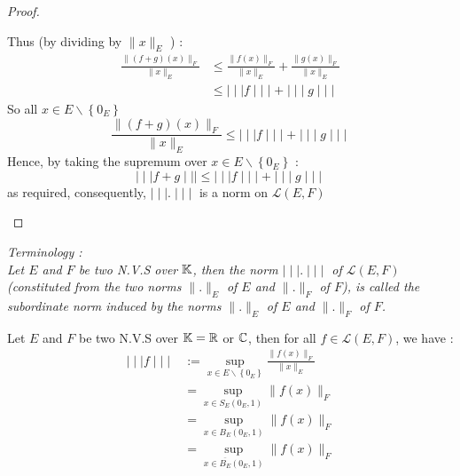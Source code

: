 \begin{proof}
\begin{enumerate}[(i)]
		Thus (by dividing by $\| x \| _{E}$ ) : 
		\begin{align*}
		\frac{\| (f+g) (x)  \|_{F} }{ \| x \|_{E} } 
		& \leq 
		\frac{\| f(x)  \| _{F}}{\| x \|_{E} } + 
		\frac{\| g(x)  \| _{F}}{\| x \| _{E}} 
		\\
		& \leq 
		\mid \mid \mid  f \mid \mid \mid  + 
		\mid \mid \mid  g \mid \mid \mid 
		\end{align*}
		So all $x \in E \backslash \left\{ 0_{E} \right\}$ 
		\[
			\frac{\| (f+g)(x)    \|_{F} }{
			\| x \| _{E}} 
			\leq 
			\mid \mid \mid  f \mid \mid \mid  +
			\mid \mid \mid  g \mid \mid \mid 
		\]
		Hence, by taking the supremum over $x \in 
		E \backslash \left\{ 0_{E} \right\}$ :
		\[
		\mid \mid \mid  f+g \mid \mid \mid  
		\leq \mid \mid \mid  f \mid \mid \mid  + 
		\mid \mid \mid  g \mid \mid \mid 
		\]
		as required, consequently, 
		$\mid \mid \mid  . \mid \mid \mid $  is a norm
		on $\mathcal{L} (E,F) $  
 \end{enumerate}
 \end{proof}
 \it Terminology : \normalfont \\
 Let $E$ and $F$  be two N.V.S over $\mathbb{K}$, then the norm
 $\mid \mid \mid  . \mid \mid \mid $ of 
 $\mathcal{L} (E,F) $ (constituted from the two norms
 $\| . \| _{E}$ of $E$ and $\| . \| _{F}$ of $F$), is called
 the subordinate norm induced by the norms $\| . \| _{E}$ of 
 $E$ and $\| . \| _{F}$  of $F$.
 \begin{theorem}[]
	 Let $E$ and $F$ be two N.V.S over $\mathbb{K} = \mathbb{R} $  or
	 $\mathbb{C} $, then for all $f \in  \mathcal{L} (E,F) $, we have
	 : 
	 \begin{align*}
		 \mid \mid \mid  f \mid \mid \mid  & :=
		 \sup_{x \in E \backslash \left\{ 0_{E} \right\}}  
		 \frac{\| f(x)  \| _{F}}{\| x \|_{E} } \\
   &= 
   \sup_{x \in S_{E}\left( 0_{E},1 \right) }  
   \| f(x)  \| _{F} \\
   &= \sup_{x \in B_{E} \left( 0_{E},1 \right)}  
   \| f(x)  \|  _{F} \\
   &= \sup_{ x \in  \overline{B_{E}} \left( 0_{E},1 \right)}  
   \| f(x)  \| _{F}
	 \end{align*}
 \end{theorem}
